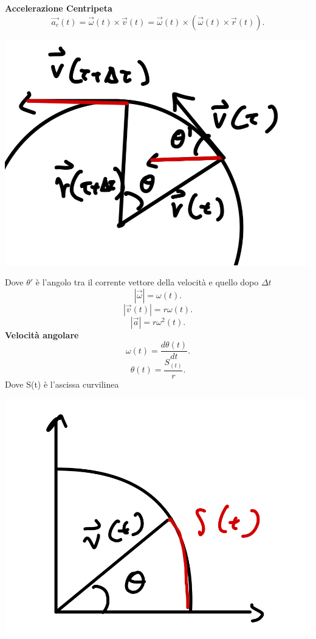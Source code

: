 \documentclass[12px]{article}
\begin{document}
	\textbf{Accelerazione Centripeta}
	\[
	\overrightarrow{a_c}(t) = \overrightarrow{\omega}(t)\times \overrightarrow{v}(t) = \overrightarrow{\omega}(t)\times(\overrightarrow{\omega}(t)\times \overrightarrow{r}(t))
	.\] 
	\begin{center}
		
	\includegraphics[scale=0.2]{grafico_4}
	\end{center}
	Dove $\theta'$ è l'angolo tra il corrente vettore della velocità e quello dopo  $\Delta t$
	\[
	| \overrightarrow{\omega}| = \omega (t)
	.\] 
	\[
	| \overrightarrow{v}(t)| = r \omega (t)
	.\] 
	\[
	| \overrightarrow{a}| = r \omega^2(t)
	.\] 
	\textbf{Velocità angolare}\\
	\[
		\omega (t) = \frac {d\theta(t)}{dt}
	.\] 
	\[
		\theta(t) = \frac {S_(t)}{r}
	.\] 
	Dove S(t) è l'ascissa curvilinea\\
	\begin{center}
	\includegraphics[scale=0.3]{grafico_5}
	\end{center}
\end{document}

